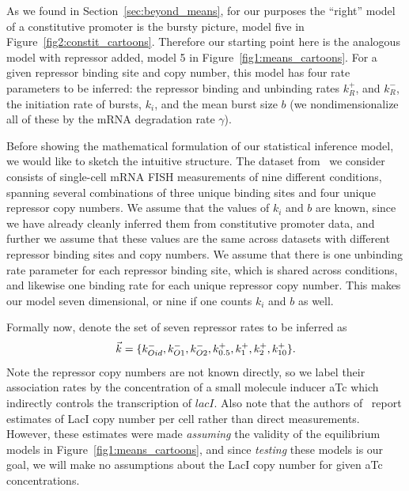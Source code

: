 As we found in Section~\ref{sec:beyond_means}, for our purposes
the ``right'' model of a constitutive promoter is the bursty
picture, model five in Figure~\ref{fig2:constit_cartoons}.
Therefore our starting point here is the analogous model with
repressor added, model 5 in Figure~\ref{fig1:means_cartoons}.
For a given repressor binding site and copy number,
this model has four rate parameters to be inferred:
the repressor binding and unbinding rates $k_R^+$, and $k_R^-$,
the initiation rate of bursts, $k_i$, and the mean burst size $b$
(we nondimensionalize all of these by the mRNA degradation rate $\gamma$).

Before showing the mathematical formulation of our statistical
inference model, we would like to sketch the intuitive structure.
The dataset from~\cite{Jones2014} we consider consists of
single-cell mRNA FISH measurements of nine different conditions,
spanning several combinations of three unique binding sites and
four unique repressor copy numbers. We assume that the values of
$k_i$ and $b$ are known, since we have already cleanly inferred
them from constitutive promoter data, and further we assume that
these values are the same across datasets with different
repressor binding sites and copy numbers. We assume that there is
one unbinding rate parameter for each repressor binding site,
which is shared across conditions, and likewise one binding rate
for each unique repressor copy number. This makes our model seven
dimensional, or nine if one counts $k_i$ and $b$ as well.

Formally now, denote the set of seven repressor rates to be inferred as
\begin{equation}
\vec{k} =\{k_{Oid}^-, k_{O1}^-, k_{O2}^-,
k_{0.5}^+, k_{1}^+, k_{2}^+, k_{10}^+\}.
\end{equation}
Note the repressor copy numbers are not known directly, so we label their
association rates by the concentration of a small molecule inducer aTc
which indirectly controls the transcription of $\textit{lacI}$.
Also note that the authors of~\cite{Jones2014} report estimates
of LacI copy number per cell rather than direct measurements.
However, these estimates were made \textit{assuming} the validity
of the equilibrium models in Figure~\ref{fig1:means_cartoons},
and since \textit{testing} these models is our goal, we will make
no assumptions about the LacI copy number for given aTc concentrations.

